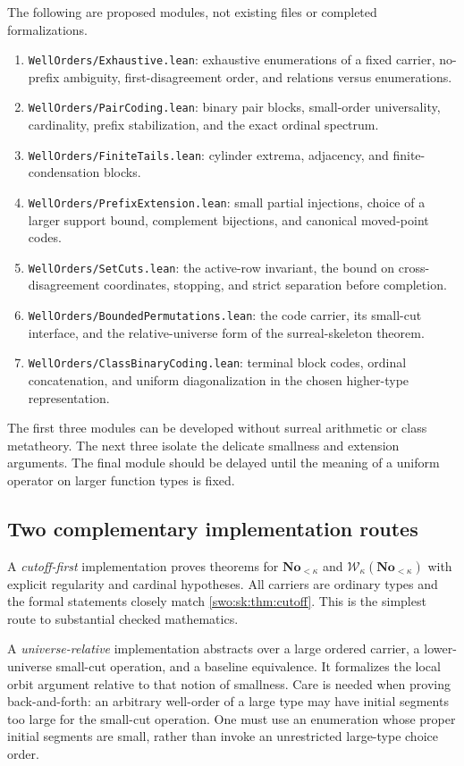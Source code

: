 \documentclass[11pt]{article}
\theoremstyle{definition}
\theoremstyle{remark}
\newcommand{\No}{\mathbf{No}}
\newcommand{\W}{\mathcal W}
\begin{document}
The following are proposed modules, not existing files or completed
formalizations.
\begin{enumerate}[label=\textbf{\arabic*.},leftmargin=*]
\item \texttt{WellOrders/Exhaustive.lean}: exhaustive enumerations of a
fixed carrier, no-prefix ambiguity, first-disagreement order, and
relations versus enumerations.
\item \texttt{WellOrders/PairCoding.lean}: binary pair blocks,
small-order universality, cardinality, prefix stabilization, and the
exact ordinal spectrum.
\item \texttt{WellOrders/FiniteTails.lean}: cylinder extrema, adjacency,
and finite-condensation blocks.
\item \texttt{WellOrders/PrefixExtension.lean}: small partial injections,
choice of a larger support bound, complement bijections, and canonical
moved-point codes.
\item \texttt{WellOrders/SetCuts.lean}: the active-row invariant, the
bound on cross-disagreement coordinates, stopping, and strict
separation before completion.
\item \texttt{WellOrders/BoundedPermutations.lean}: the code carrier,
its small-cut interface, and the relative-universe form of the
surreal-skeleton theorem.
\item \texttt{WellOrders/ClassBinaryCoding.lean}: terminal block codes,
ordinal concatenation, and uniform diagonalization in the chosen
higher-type representation.
\end{enumerate}

The first three modules can be developed without surreal arithmetic or
class metatheory. The next three isolate the delicate smallness and
extension arguments. The final module should be delayed until the
meaning of a uniform operator on larger function types is fixed.

\subsection{Two complementary implementation routes}

A \emph{cutoff-first} implementation proves theorems for
$\No_{<\kappa}$ and $\W_\kappa(\No_{<\kappa})$ with explicit regularity
and cardinal hypotheses. All carriers are ordinary types and the
formal statements closely match \cref{swo:sk:thm:cutoff}. This is the simplest
route to substantial checked mathematics.

A \emph{universe-relative} implementation abstracts over a large
ordered carrier, a lower-universe small-cut operation, and a baseline
equivalence. It formalizes the local orbit argument relative to that
notion of smallness. Care is needed when proving back-and-forth: an
arbitrary well-order of a large type may have initial segments too
large for the small-cut operation. One must use an enumeration whose
proper initial segments are small, rather than invoke an unrestricted
large-type choice order.
\end{document}

